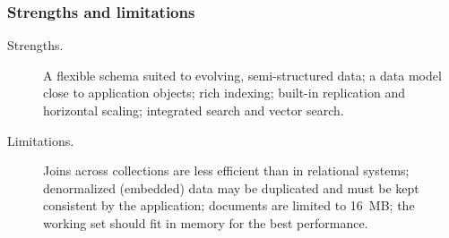 \subsubsection{Strengths and limitations}
\begin{description}
  \item[Strengths.] A flexible schema suited to evolving, semi-structured data; a data model
        close to application objects; rich indexing; built-in replication and horizontal scaling;
        integrated search and vector search.
  \item[Limitations.] Joins across collections are less efficient than in relational systems;
        denormalized (embedded) data may be duplicated and must be kept consistent by the
        application; documents are limited to 16~MB; the working set should fit in memory for the
        best performance.
\end{description}
